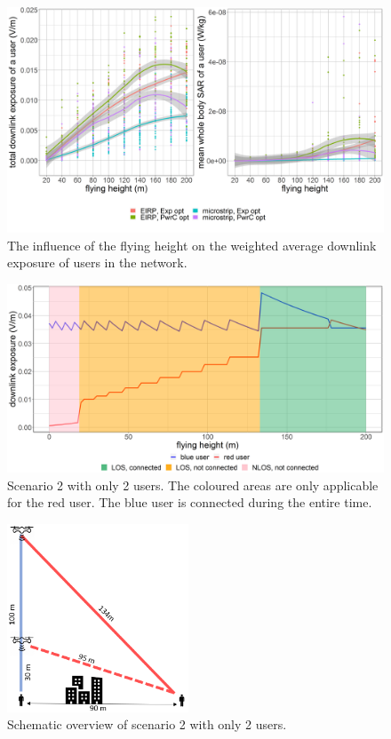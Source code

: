\begin{figure}[h!]
  \includegraphics[width=\textwidth]{../results/s2/fhvsdlAndPc.png}
  \caption{The influence of the flying height on the weighted average downlink exposure of users in the network.}
  \label{fig:s2a_dlAndPc}
\end{figure}

\begin{figure}[bh!]
  \includegraphics[width=\textwidth]{../results/s2/prove.png}
  \caption{Scenario 2 with only 2 users. The coloured areas are only applicable for the red user. The blue user is connected during the entire time.}
  \label{fig:prove}
\end{figure}


\begin{figure}
  \begin{center}
    \includegraphics[width=0.48\textwidth]{../results/s2/proveScenario.png}
  \end{center}
  \caption{Schematic overview of scenario 2 with only 2 users.}
  \label{fig:schematicprove}
\end{figure}


